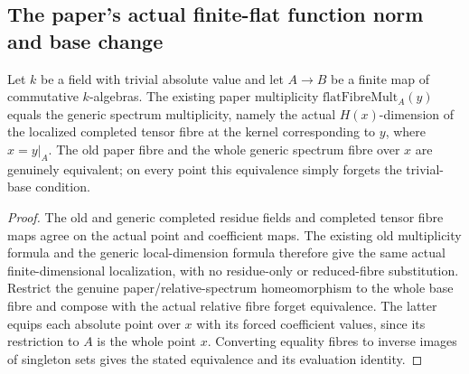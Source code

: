 \subsection{The paper's actual finite-flat function norm and base change}
\label{subsec:paper-flat-norm-base-change}

\begin{theorem}
\label{spectrum:paper-flat-fibre-identification}
\leanok
{}
Let $k$ be a field with trivial absolute value and let $A\to B$ be a finite
map of commutative $k$-algebras. The existing paper multiplicity
$\mathrm{flatFibreMult}_A(y)$ equals the generic spectrum multiplicity,
namely the actual $H(x)$-dimension of the localized completed tensor fibre
at the kernel corresponding to $y$, where $x=y|_A$. The old paper fibre
and the whole generic spectrum fibre over $x$ are genuinely equivalent;
on every point this equivalence simply forgets the trivial-base condition.
\end{theorem}
\begin{proof}
The old and generic completed residue fields and completed tensor fibre
maps agree on the actual point and coefficient maps. The existing old
multiplicity formula and the generic local-dimension formula therefore
give the same actual finite-dimensional localization, with no residue-only
or reduced-fibre substitution. Restrict the genuine paper/relative-spectrum
homeomorphism to the whole base fibre and compose with the actual relative
fibre forget equivalence. The latter equips each absolute point over $x$
with its forced coefficient values, since its restriction to $A$ is the
whole point $x$. Converting equality fibres to inverse images of singleton
sets gives the stated equivalence and its evaluation identity.
\end{proof}

